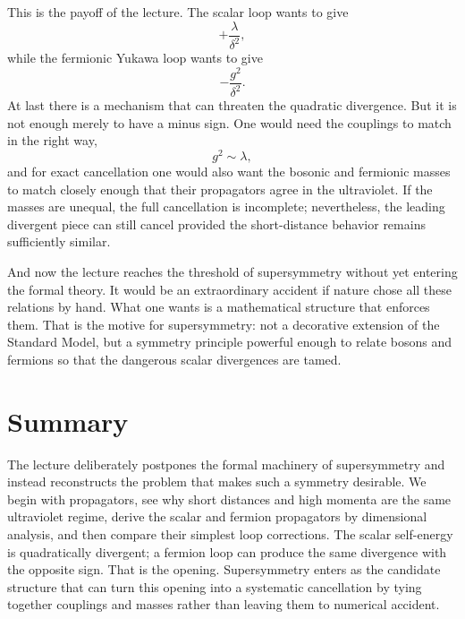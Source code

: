 This is the payoff of the lecture. The scalar loop wants to give
\begin{equation}
+\frac{\lambda}{\delta^2},
\end{equation}
while the fermionic Yukawa loop wants to give
\begin{equation}
-\frac{g^2}{\delta^2}.
\end{equation}
At last there is a mechanism that can threaten the quadratic divergence. But it is not enough merely to have a minus sign. One would need the couplings to match in the right way,
\begin{equation}
g^2 \sim \lambda,
\end{equation}
and for exact cancellation one would also want the bosonic and fermionic masses to match closely enough that their propagators agree in the ultraviolet. If the masses are unequal, the full cancellation is incomplete; nevertheless, the leading divergent piece can still cancel provided the short-distance behavior remains sufficiently similar.

And now the lecture reaches the threshold of supersymmetry without yet entering the formal theory. It would be an extraordinary accident if nature chose all these relations by hand. What one wants is a mathematical structure that enforces them. That is the motive for supersymmetry: not a decorative extension of the Standard Model, but a symmetry principle powerful enough to relate bosons and fermions so that the dangerous scalar divergences are tamed.

\section{Summary}

The lecture deliberately postpones the formal machinery of supersymmetry and instead reconstructs the problem that makes such a symmetry desirable. We begin with propagators, see why short distances and high momenta are the same ultraviolet regime, derive the scalar and fermion propagators by dimensional analysis, and then compare their simplest loop corrections. The scalar self-energy is quadratically divergent; a fermion loop can produce the same divergence with the opposite sign. That is the opening. Supersymmetry enters as the candidate structure that can turn this opening into a systematic cancellation by tying together couplings and masses rather than leaving them to numerical accident.